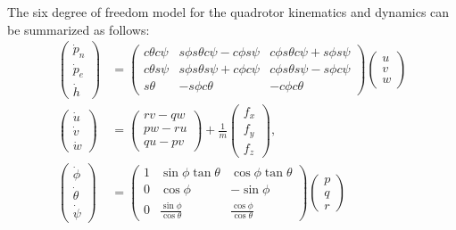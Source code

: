 {The six degree of freedom model for the quadrotor kinematics and
dynamics can be summarized as follows:
\begin{align}
\begin{pmatrix} \dot{p}_n \\ \dot{p}_e \\ \dot{h} \end{pmatrix}
&= \begin{pmatrix} c\theta c\psi & s\phi s\theta c\psi - c\phi s\psi
    & c\phi s\theta c\psi + s\phi s\psi \\
    c\theta s\psi &  s\phi s\theta s\psi + c\phi c\psi
    & c\phi s\theta s\psi - s\phi c\psi  \\
    s\theta & -s\phi c\theta & -c\phi c\theta
    \end{pmatrix}
    \begin{pmatrix} u \\ v \\ w \end{pmatrix}
    \label{eq:kin-eom-xyh} \\
\begin{pmatrix} \dot{u} \\ \dot{v} \\ \dot{w} \end{pmatrix}
&= \begin{pmatrix} rv-qw \\ pw-ru \\ qu-pv \end{pmatrix} +
    \frac{1}{m} \begin{pmatrix} f_x \\ f_y \\ f_z \end{pmatrix},
    \label{eq:kin-eom-v}\\
\begin{pmatrix} \dot{\phi} \\ \dot{\theta} \\ \dot{\psi} \end{pmatrix}
& = \begin{pmatrix}
    1 & \sin\phi\tan\theta & \cos\phi\tan\theta \\
    0 & \cos\phi & -\sin\phi \\
    0 & \frac{\sin\phi}{\cos\theta} & \frac{\cos\phi}{\cos\theta}
    \end{pmatrix}
    \begin{pmatrix} p \\ q \\ r \end{pmatrix}

\end{align}}
